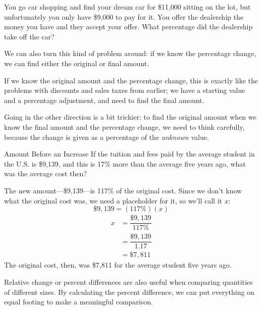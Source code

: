 \begin{try}
You go car shopping and find your dream car for \$11,000 sitting on the lot, but unfortunately you only have \$9,000 to pay for it.  You offer the dealership the money you have and they accept your offer.  What percentage did the dealership take off the car?
\end{try}

We can also turn this kind of problem around: if we know the percentage change, we can find either the original or final amount.

If we know the original amount and the percentage change, this is exactly like the problems with discounts and sales taxes from earlier; we have a starting value and a percentage adjustment, and need to find the final amount.

Going in the other direction is a bit trickier: to find the original amount when we know the final amount and the percentage change, we need to think carefully, because the change is given as a percentage of the \emph{unknown} value.

\begin{example}[https://www.youtube.com/watch?v=gB3RqkMzDDE&list=PLfmpjsIzhztsZtnb7HnXrQ8SLoiOCIcAM&index=10]{Amount Before an Increase}
If the tuition and fees paid by the average student in the U.S. is \$9,139, and this is 17\% more than the average five years ago, what was the average cost then?

\solline

The new amount---\$9,139---is 117\% of the original cost.  Since we don't know what the original cost was, we need a placeholder for it, so we'll call it $x$:
\[\$9,139 = (117\%)(x)\]
\begin{align*}
x &= \dfrac{\$9,139}{117\%}\\
&= \dfrac{\$9,139}{1.17}\\
&= \boxed{\$7,811}
\end{align*}
The original cost, then, was \$7,811 for the average student five years ago.
\end{example}

Relative change or percent differences are also useful when comparing quantities of different sizes.  By calculating the percent difference, we can put everything on equal footing to make a meaningful comparison.

